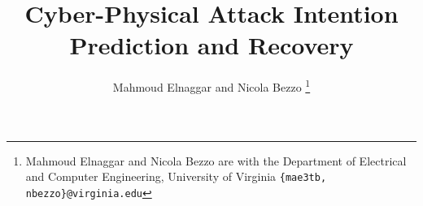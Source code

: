 \documentclass[letterpaper, 10 pt, conference]{ieeeconf}  %
\newcommand*{\affmark}[1][*]{\textsuperscript{#1}}
\begin{document}
\title{Cyber-Physical Attack Intention Prediction and Recovery}




\author{Mahmoud Elnaggar and Nicola Bezzo %
\thanks{Mahmoud Elnaggar and Nicola Bezzo are with the Department of Electrical and Computer Engineering, University of Virginia
        {\tt\small  \{mae3tb, nbezzo\}@virginia.edu}}
}


\maketitle
\end{document}
